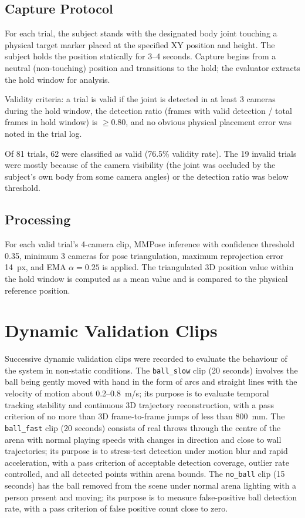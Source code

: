 \subsection{Capture Protocol}

For each trial, the subject stands with the designated body joint touching a physical target marker placed at the specified XY position and height. The subject holds the position statically for 3--4 seconds. Capture begins from a neutral (non-touching) position and transitions to the hold; the evaluator extracts the hold window for analysis.

Validity criteria: a trial is valid if the joint is detected in at least 3 cameras during the hold window, the detection ratio (frames with valid detection / total frames in hold window) is $\geq 0.80$, and no obvious physical placement error was noted in the trial log.

Of 81 trials, 62 were classified as valid (76.5\% validity rate). The 19 invalid trials were mostly because of the camera visibility (the joint was occluded by the subject's own body from some camera angles) or the detection ratio was below threshold.

\subsection{Processing}

For each valid trial's 4-camera clip, MMPose inference with confidence threshold 0.35, minimum 3 cameras for pose triangulation, maximum reprojection error 14~px, and EMA $\alpha = 0.25$ is applied. The triangulated 3D position value within the hold window is computed as a mean value and is compared to the physical reference position.


\section{Dynamic Validation Clips}

Successive dynamic validation clips were recorded to evaluate the behaviour of the system in non-static conditions. The \texttt{ball\_slow} clip (20 seconds) involves the ball being gently moved with hand in the form of arcs and straight lines with the velocity of motion about 0.2--0.8~m/s; its purpose is to evaluate temporal tracking stability and continuous 3D trajectory reconstruction, with a pass criterion of no more than 3D frame-to-frame jumps of less than 800~mm. The \texttt{ball\_fast} clip (20 seconds) consists of real throws through the centre of the arena with normal playing speeds with changes in direction and close to wall trajectories; its purpose is to stress-test detection under motion blur and rapid acceleration, with a pass criterion of acceptable detection coverage, outlier rate controlled, and all detected points within arena bounds. The \texttt{no\_ball} clip (15 seconds) has the ball removed from the scene under normal arena lighting with a person present and moving; its purpose is to measure false-positive ball detection rate, with a pass criterion of false positive count close to zero.


